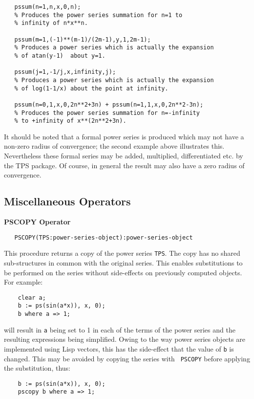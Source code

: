 {\begin{verbatim}
   pssum(n=1,n,x,0,n);
   % Produces the power series summation for n=1 to
   % infinity of n*x**n.

   pssum(m=1,(-1)**(m-1)/(2m-1),y,1,2m-1);
   % Produces a power series which is actually the expansion
   % of atan(y-1)  about y=1.

   pssum(j=1,-1/j,x,infinity,j);
   % Produces a power series which is actually the expansion
   % of log(1-1/x) about the point at infinity.

   pssum(n=0,1,x,0,2n**2+3n) + pssum(n=1,1,x,0,2n**2-3n);
   % Produces the power series summation for n=-infinity
   % to +infinity of x**(2n**2+3n).
\end{verbatim}
It should be noted that a formal power series is produced which may not have
a non-zero radius of convergence; the second example above illustrates this.
Nevertheless these formal series may be added, multiplied, differentiated etc.
by the TPS package. Of course, in general the result may also have a zero radius
of convergence.

\subsection{Miscellaneous Operators}

\textbf{PSCOPY Operator}
\hypertarget{operator:PSCOPY}{}
\begin{verbatim}
   PSCOPY(TPS:power-series-object):power-series-object
\end{verbatim}
This procedure returns a copy of the power series \texttt{TPS}. 
The copy has no shared sub-structures in common with the original
 series.  This enables substitutions to be performed on the series
 without side-effects on previously computed objects. For example:
\begin{verbatim}
    clear a;
    b := ps(sin(a*x)), x, 0);
    b where a => 1;
\end{verbatim}

will result in \texttt{a} being set to 1 in each of the terms of the
power series and the resulting expressions being simplified. Owing to
the way power series objects are implemented using Lisp vectors, this
has the side-effect that the value of \texttt{b} is changed.  This may be
avoided by copying the series with \texttt{ PSCOPY} before applying the
substitution, thus:
\begin{verbatim}
    b := ps(sin(a*x)), x, 0);
    pscopy b where a => 1;
\end{verbatim}

}
